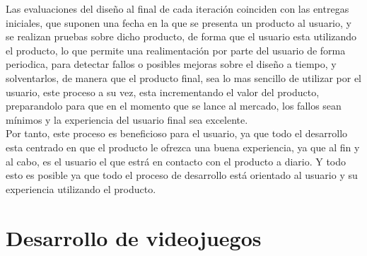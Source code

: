 Las evaluaciones del diseño al final de cada iteración coinciden con las entregas iniciales, que suponen una fecha en la que se presenta un producto al usuario, y se realizan pruebas sobre dicho producto, de forma que el usuario esta utilizando el producto, lo que permite una realimentación por parte del usuario de forma periodica, para detectar fallos o posibles mejoras sobre el diseño a tiempo, y solventarlos, de manera que el producto final, sea lo mas sencillo de utilizar por el usuario, este proceso a su vez, esta incrementando el valor del producto, preparandolo para que en el momento que se lance al mercado, los fallos sean mínimos y la experiencia del usuario final sea excelente.\\

Por tanto, este proceso es beneficioso para el usuario, ya que todo el desarrollo esta centrado en que el producto le ofrezca una buena experiencia, ya que al fin y al cabo, es el usuario el que estrá en contacto con el producto a diario. Y todo esto es posible ya que todo el proceso de desarrollo está orientado al usuario y su experiencia utilizando el producto.

\section{Desarrollo de videojuegos}
